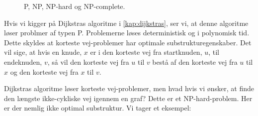 \begin{figure}[H]
\centering
	\caption{P, NP, NP-hard og NP-complete.}
	\label{fig.dijkstraexmp}
\end{figure}

Hvis vi kigger på Dijkstras algoritme i \autoref{kap:dijkstras}, ser vi, at denne algoritme løser problmer af typen P. Problemerne løses deterministisk og i polynomisk tid. Dette skyldes at korteste vej-problemer har optimale substrukturegenskaber. Det vil sige, at hvis en knude, $x$ er i den korteste vej fra startknuden, $u$, til endeknuden, $v$, så vil den korteste vej fra $u$ til $v$ bestå af den korteste vej fra $u$ til $x$ og den korteste vej fra $x$ til $v$. 

Dijkstras algoritme løser korteste vej-problemer, men hvad hvis vi ønsker, at finde den længste ikke-cykliske vej igennem en graf? Dette er et NP-hard-problem. Her er der nemlig ikke optimal substruktur. Vi tager et eksempel:

